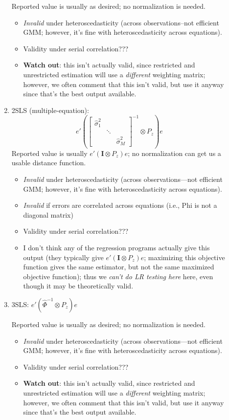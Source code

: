 \documentclass[8pt,letterpaper, landscape]{extarticle} %
\newcommand{\mI}{\ensuremath{\mathbf{I}}}
\begin{document}
\begin{multicols}{3}
\begin{description}
\begin{enumerate}
Reported value is usually as desired; no normalization is needed.
\begin{itemize}
\item \textit{Invalid} under heteroscedasticity (across observations--not efficient GMM; however, it's fine with heteroscedasticity across equations).
\item Validity under serial correlation???
\item \textbf{Watch out}: this isn't actually valid, since restricted and unrestricted estimation will use a \textit{different} weighting matrix; however, we often comment that this isn't valid, but use it anyway since that's the best output available.
\end{itemize}
\item 2SLS (multiple-equation):
$$ e'  \left( \begin{bmatrix}
\hat{\sigma}_{1}^{2} & & \\
& \ddots & \\
& & \hat{\sigma}_{M}^{2}
\end{bmatrix}^{-1} \otimes P_z \right) e $$
Reported value is usually $ e' (\mI \otimes P_z) e $; no normalization can get us a usable distance function.
\begin{itemize}
\item \textit{Invalid} under heteroscedasticity (across observations---not efficient GMM; however, it's fine with heteroscedasticity across equations).
\item \textit{Invalid} if errors are correlated across equations (i.e., Phi is not a diagonal matrix)
\item Validity under serial correlation???
\item I don't think any of the regression programs actually give this output (they typically give $ e' (\mI \otimes P_z) e $; maximizing this objective function gives the same estimator, but not the same maximized objective function); thus we \textit{can't do LR testing here} here, even though it may be theoretically valid.
\end{itemize}
\item 3SLS: $ e' (\widehat{\Phi}^{-1} \otimes P_z) e $

Reported value is usually as desired; no normalization is needed.
\begin{itemize}
\item \textit{Invalid} under heteroscedasticity (across observations---not efficient GMM; however, it's fine with heteroscedasticity across equations).
\item Validity under serial correlation???
\item \textbf{Watch out}: this isn't actually valid, since restricted and unrestricted estimation will use a \textit{different} weighting matrix; however, we often comment that this isn't valid, but use it anyway since that's the best output available.
\end{itemize}
\end{enumerate}


\end{description}
\end{multicols}
\end{document}
